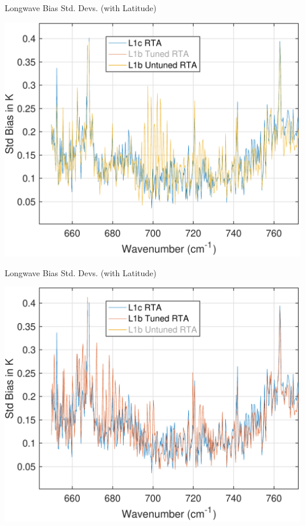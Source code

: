 \documentclass[10pt,t]{beamer}
\begin{document}
\begin{frame}[label={sec:org0f46d77},noframenumbering]{Longwave Bias Std. Devs. (with Latitude)}
\begin{center}
\includegraphics[width=0.75\linewidth]{./Talk2/std_3rta_lw_noL1btuning.pdf}
\end{center}
\end{frame}

\begin{frame}[label={sec:orga29dad3},noframenumbering]{Longwave Bias Std. Devs. (with Latitude)}
\begin{center}
\includegraphics[width=0.75\linewidth]{./Talk2/std_3rta_lw_nol1b_untuned.pdf}
\end{center}
\end{frame}
\end{document}
